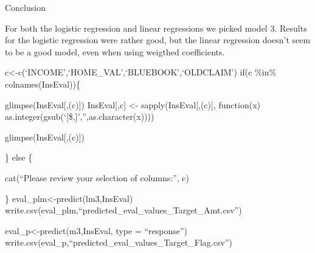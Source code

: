 \documentclass[]{article}
\begin{document}
Conclusion

For both the logistic regression and linear regressions we picked model
3. Results for the logistic regression were rather good, but the linear
regression doesn't seem to be a good model, even when using weigthed
coefficients.

c\textless-c(`INCOME',`HOME\_VAL',`BLUEBOOK',`OLDCLAIM') if(c \%in\%
colnames(InsEval))\{

glimpse(InsEval{[},(c){]}) InsEval{[},c{]} \textless-
sapply(InsEval{[},(c){]}, function(x)
as.integer(gsub(`{[}\$,{]}','',as.character(x))))

glimpse(InsEval{[},(c){]})

\} else \{

cat(``Please review your selection of columns:'', c)

\} eval\_plm\textless-predict(lm3,InsEval)
write.csv(eval\_plm,``predicted\_eval\_values\_Target\_Amt.csv'')

eval\_p\textless-predict(m3,InsEval, type = ``response'')
write.csv(eval\_p,``predicted\_eval\_values\_Target\_Flag.csv'')
\end{document}
